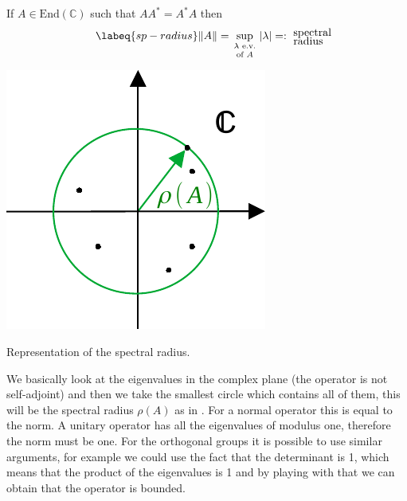 \documentclass[../main.tex]{subfiles}
\begin{document}
\begin{kaobox}[frametitle=Remark]
If $A\in \textrm{End}(\mathbb{C})$ such that $AA^\ast=A^\ast A$ then
\begin{equation}\labeq{sp-radius}
\norm{A}= \sup_{\text{\parbox{0.8 cm}{\centering $\lambda$ e.v. \\[-4pt] of $A$}}}\abs{\lambda}=: \ \text{\parbox{0.8 cm}{\centering spectral \\[-4pt] radius}}
\end{equation}
\end{kaobox}
\begin{marginfigure}
	\includegraphics[width=1\linewidth]{images/autovalori_oper.pdf}
	\caption{Representation of the spectral radius.}
\end{marginfigure}
We basically look at the eigenvalues in the complex plane (the operator is not self-adjoint) and then we take the smallest circle which contains all of them, this will be the spectral radius $\rho(A)$ as in . For a normal operator this is equal to the norm. A unitary operator has all the eigenvalues of modulus one, therefore the norm must be one. For the orthogonal groups it is possible to use similar arguments, for example we could use the fact that the determinant is 1, which means that the product of the eigenvalues is 1 and by playing with that we can obtain that the operator is bounded.
\end{document}
